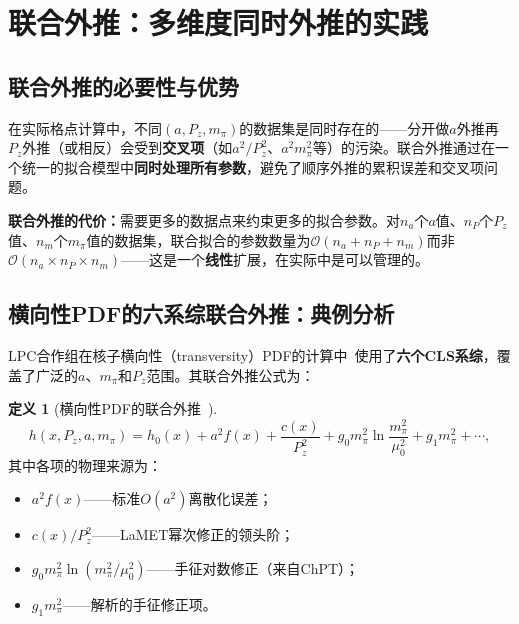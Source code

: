 \documentclass[12pt,a4paper]{ctexart}
\theoremstyle{definition}
\newtheorem{definition}{定义}[section]
\begin{document}
\section{联合外推：多维度同时外推的实践}

\subsection{联合外推的必要性与优势}

在实际格点计算中，不同$(a, P_z, m_\pi)$的数据集是同时存在的——分开做$a$外推再$P_z$外推（或相反）会受到\textbf{交叉项}（如$a^2/P_z^2$、$a^2 m_\pi^2$等）的污染。联合外推通过在一个统一的拟合模型中\textbf{同时处理所有参数}，避免了顺序外推的累积误差和交叉项问题。

\textbf{联合外推的代价：}需要更多的数据点来约束更多的拟合参数。对$n_a$个$a$值、$n_P$个$P_z$值、$n_m$个$m_\pi$值的数据集，联合拟合的参数数量为$\mathcal{O}(n_a + n_P + n_m)$而非$\mathcal{O}(n_a \times n_P \times n_m)$——这是一个\textbf{线性}扩展，在实际中是可以管理的。

\subsection{横向性PDF的六系综联合外推：典例分析}

LPC合作组在核子横向性（transversity）PDF的计算中~\cite{NucleonTransversity2024}使用了\textbf{六个CLS系综}，覆盖了广泛的$a$、$m_\pi$和$P_z$范围。其联合外推公式为：

\begin{definition}[横向性PDF的联合外推~\cite{NucleonTransversity2024}]
\begin{equation}
\boxed{
h(x, P_z, a, m_\pi) = h_0(x) + a^2 f(x) + \frac{c(x)}{P_z^2} + g_0 m_\pi^2 \ln\frac{m_\pi^2}{\mu_0^2} + g_1 m_\pi^2 + \cdots,
}
\label{eq:transversity_joint}
\end{equation}
其中各项的物理来源为：
\begin{itemize}[nosep]
    \item $a^2 f(x)$——标准$O(a^2)$离散化误差；
    \item $c(x)/P_z^2$——LaMET幂次修正的领头阶；
    \item $g_0 m_\pi^2 \ln(m_\pi^2/\mu_0^2)$——手征对数修正（来自ChPT）；
    \item $g_1 m_\pi^2$——解析的手征修正项。
\end{itemize}
\end{definition}
\end{document}

